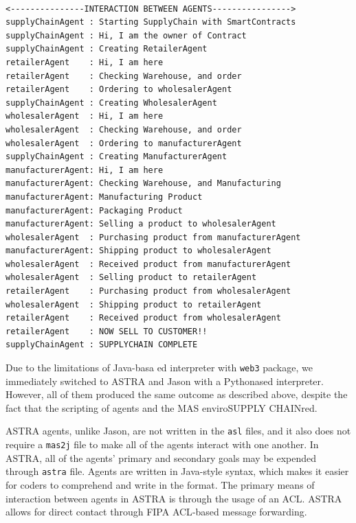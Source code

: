 \begin{lstlisting}[caption={Agent Interaction without smart contracts},label={Scenario}, numbers=none, basicstyle=\ttfamily\tiny]

<---------------INTERACTION BETWEEN AGENTS---------------->
supplyChainAgent : Starting SupplyChain with SmartContracts
supplyChainAgent : Hi, I am the owner of Contract
supplyChainAgent : Creating RetailerAgent
retailerAgent    : Hi, I am here
retailerAgent    : Checking Warehouse, and order
retailerAgent    : Ordering to wholesalerAgent
supplyChainAgent : Creating WholesalerAgent
wholesalerAgent  : Hi, I am here
wholesalerAgent  : Checking Warehouse, and order
wholesalerAgent  : Ordering to manufacturerAgent
supplyChainAgent : Creating ManufacturerAgent
manufacturerAgent: Hi, I am here
manufacturerAgent: Checking Warehouse, and Manufacturing
manufacturerAgent: Manufacturing Product
manufacturerAgent: Packaging Product
manufacturerAgent: Selling a product to wholesalerAgent
wholesalerAgent  : Purchasing product from manufacturerAgent
manufacturerAgent: Shipping product to wholesalerAgent
wholesalerAgent  : Received product from manufacturerAgent
wholesalerAgent  : Selling product to retailerAgent
retailerAgent    : Purchasing product from wholesalerAgent
wholesalerAgent  : Shipping product to retailerAgent
retailerAgent    : Received product from wholesalerAgent
retailerAgent    : NOW SELL TO CUSTOMER!!
supplyChainAgent : SUPPLYCHAIN COMPLETE
\end{lstlisting}

\vspace{.5cm}

Due to the limitations of Java-basa ed interpreter with \texttt{web3} package, we immediately switched to ASTRA and Jason with a Pythonased interpreter. However, all of them produced the same outcome as described above, despite the fact that the scripting of agents and the \ac{MAS} enviroSUPPLY CHAINred.

\vspace{.5cm}

ASTRA agents, unlike Jason, are not written in the \texttt{asl} files, and it also does not require a \texttt{mas2j} file to make all of the agents interact with one another. In ASTRA, all of the agents' primary and secondary goals may be expended through \texttt{astra} file. Agents are written in Java-style syntax, which makes it easier for coders to comprehend and write in the format. The primary means of interaction between agents in ASTRA is through the usage of an \ac{ACL}. ASTRA allows for direct contact through \ac{FIPA} \ac{ACL}-based message forwarding.

